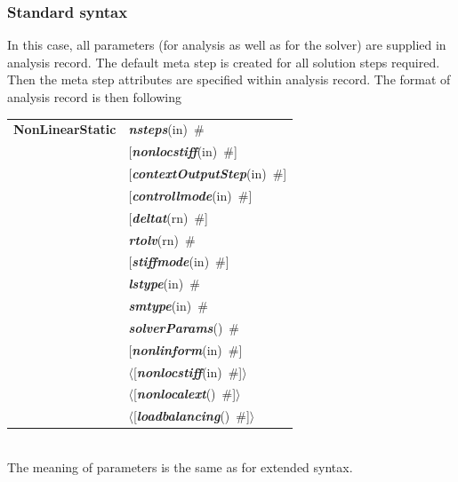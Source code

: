 \documentclass[a4paper]{article}
\makeatletter
\newcommand{\keywordnotype}[1]{\mbox{{\it{\bf{#1}}}}}
\newcommand{\keyword}[2]{\mbox{{\keywordnotype{#1}\tiny (#2)}}}
\newcommand{\entKeywordInst}[1]{\mbox{{\bf{{#1}}}}}
\newcommand{\field}[2]{\mbox{\keyword{#1}{#2}~\#}}
\newcommand{\optField}[2]{\mbox{[\field{#1}{#2}]}}
\newcommand{\PoptField}[2]{\mbox{$\langle$[\field{#1}{#2}]$\rangle$}}
\newenvironment{record}[1][]{\begin{tabular}{|ll}}{\end{tabular}\\}
\newcommand{\recentry}[2]{{#1}&{#2}\\}
\newcounter{rcc}
\newenvironment{record}[1][\textwidth]{\setcounter{rcc}{0}\begin{tabular*}{#1}{|ll@{\extracolsep{\fill}}r}}{\end{tabular*}\\}
\newcommand{\recentry}[2]{\ifthenelse{\value{rcc}>0}{&$\backslash$ \\}{\setcounter{rcc}{1}}{#1}&{#2}}
\makeatother
\begin{document}
\subsubsection{Standard syntax}
In this case, all parameters (for analysis as well as for the solver)
are supplied in analysis record. The default meta step is created for
all solution steps required. Then the meta step attributes are
specified within analysis record. The format of analysis record is
then following\\

\noindent
\begin{record}
\recentry{\entKeywordInst{NonLinearStatic}}{\field{nsteps}{in}}
\recentry{}{\optField{nonlocstiff}{in}}
\recentry{}{\optField{contextOutputStep}{in}} \recentry{}{\optField{controllmode}{in}} 
\recentry{}{\optField{deltat}{rn}}
\recentry{}{\field{rtolv}{rn}} \recentry{}{\optField{stiffmode}{in}} \recentry{}{\field{lstype}{in}}
\recentry{}{\field{smtype}{in}} \recentry{}{\field{solverParams}{}}
\recentry{}{\optField{nonlinform}{in}}
\recentry{}{\PoptField{nonlocstiff}{in}} 
\recentry{}{\PoptField{nonlocalext}{}} \recentry{}{\PoptField{loadbalancing}{}}
\end{record}
The meaning of parameters is the same as for extended syntax.

%
\end{document}
